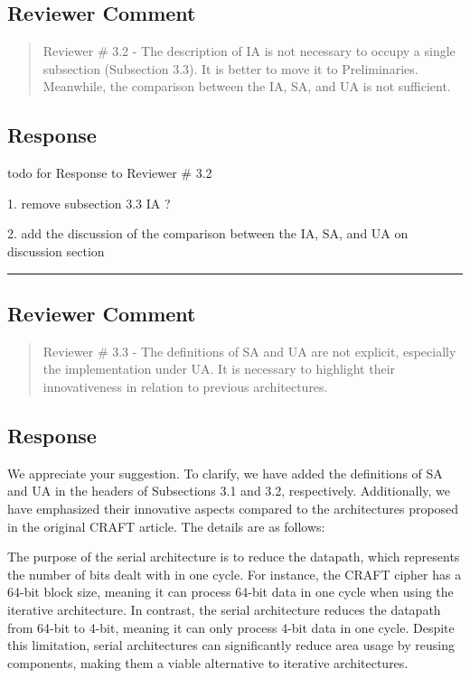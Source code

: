 \subsection{Reviewer Comment}
\begin{mdframed}
	\begin{quote}
		Reviewer \# 3.2 - The description of IA is not necessary to occupy a single subsection (Subsection 3.3). It is better to move it to Preliminaries. Meanwhile, the comparison between the IA, SA, and UA is not sufficient.
	\end{quote}
\end{mdframed}

\subsection{Response}

todo for Response to Reviewer \# 3.2

1. remove subsection 3.3 IA ?

2. add the discussion of the comparison between the IA, SA, and UA on discussion section

\noindent\rule{\linewidth}{2.0pt}

\subsection{Reviewer Comment}
\begin{mdframed}
	\begin{quote}
		Reviewer \# 3.3 - The definitions of SA and UA are not explicit, especially the implementation under UA. It is necessary to highlight their innovativeness in relation to previous architectures.
	\end{quote}
\end{mdframed}

\subsection{Response}

We appreciate your suggestion. To clarify, we have added the definitions of SA and UA in the headers of Subsections 3.1 and 3.2, respectively. Additionally, we have emphasized their innovative aspects compared to the architectures proposed in the original CRAFT article. The details are as follows:

\color{blue}
The purpose of the serial architecture is to reduce the datapath, which represents the number of bits dealt with in one cycle. For instance, the CRAFT cipher has a 64-bit block size, meaning it can process 64-bit data in one cycle when using the iterative architecture. In contrast, the serial architecture reduces the datapath from 64-bit to 4-bit, meaning it can only process 4-bit data in one cycle. Despite this limitation, serial architectures can significantly reduce area usage by reusing components, making them a viable alternative to iterative architectures.

